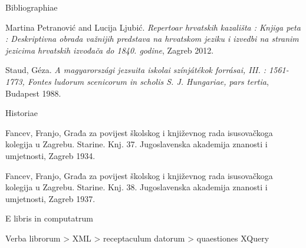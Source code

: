 \documentclass[14pt]{beamer}
\begin{document}
\begin{frame}{Bibliographiae}

Martina Petranović and Lucija Ljubić. \emph{Repertoar hrvatskih kazališta : Knjiga peta : Deskriptivna obrada važnijih predstava na hrvatskom jeziku i izvedbi na stranim jezicima hrvatskih izvođača do 1840. godine}, Zagreb 2012.

Staud, Géza. \emph{A magyarországi jezsuita iskolai színjátékok forrásai, III. : 1561-1773, Fontes ludorum scenicorum in scholis S. J. Hungariae, pars tertia}, Budapest 1988.

\end{frame}
\begin{frame}{Historiae}

Fancev, Franjo, Građa za povijest školskog i književnog rada
isusovačkoga kolegija u Zagrebu. Starine. Knj. 37. Jugoslavenska
akademija znanosti i umjetnosti, Zagreb 1934.

Fancev, Franjo, Građa za povijest školskog i književnog rada
isusovačkoga kolegija u Zagrebu. Starine. Knj. 38. Jugoslavenska
akademija znanosti i umjetnosti, Zagreb 1937.

\end{frame}

\begin{frame}{E libris in computatrum}

Verba librorum > XML > receptaculum datorum > quaestiones XQuery

\end{frame}

{
    \begin{frame}[plain]
    \end{frame}
    }









  \maketitle
\end{document}
